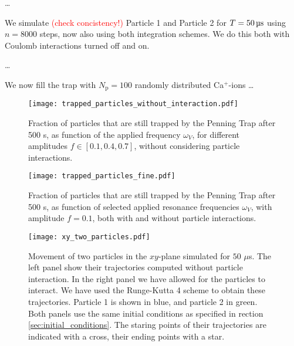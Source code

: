 \dots



We simulate \textcolor{red}{(check concistency!)} Particle 1 and Particle 2 for $T = 50 \,\mathrm{\text{\textmu} s}$ using $n=8000$ steps, now also using both integration schemes. We do this both with Coulomb interactions turned off and on. 


\dots


We now fill the trap with $N_\mathrm{p} = 100$ randomly distributed Ca$^+$-ions \dots

\begin{figure}
    \texttt{[image: trapped\_particles\_without\_interaction.pdf]}
    \caption{Fraction of particles that are still trapped by the Penning Trap after 500 \textmu s, as function of the applied frequency $\omega_V$, for different amplitudes $f\in[0.1, 0.4, 0.7]$, without considering particle interactions.}
    \label{fig:trapped_without}
\end{figure}

\begin{figure}
    \texttt{[image: trapped\_particles\_fine.pdf]}
    \caption{Fraction of particles that are still trapped by the Penning Trap after 500 \textmu s, as function of selected applied resonance frequencies $\omega_V$, with amplitude $f=0.1$, both with and without particle interactions.}
    \label{fig:trapped_with}
\end{figure}



\newpage
\onecolumngrid


\begin{figure}[h!]
    \texttt{[image: xy\_two\_particles.pdf]}
    \caption{Movement of two particles in the $xy$-plane simulated for $50$ $\mu$s. The left panel show their trajectories computed without particle interaction. In the right panel we have allowed for the particles to interact. We have used the Runge-Kutta 4 scheme to obtain these trajectories. Particle 1 is shown in blue, and particle 2 in green. Both panels use the same initial conditions as specified in rection \ref{sec:initial_conditions}. The staring points of their trajectories are indicated with a cross, their ending points with a star. }
    \label{fig:xy_two_particles}
\end{figure}

